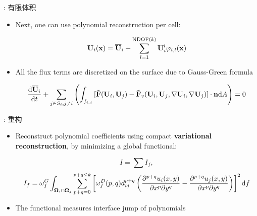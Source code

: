 \documentclass[aspectratio=169,serif]{beamer} %
\begin{document}
\begin{frame}{\secname: 有限体积}
  \begin{itemize}
    \item Next, one can use polynomial reconstruction per cell:
          \begin{block}{}
            \begin{equation}
              \label{eq:FVRec}
              \mathbf{U}_i(\mathbf{x}) = \overline{\mathbf{U}}_i + \sum_{l=1}^{\mathrm{NDOF}(k)}{\mathbf{U}_i^l\varphi_{i,l}(\mathbf{x}) }
            \end{equation}
          \end{block}
    \item All the flux terms are discretized on the surface due to Gauss-Green formula
          \begin{block}{}
            \begin{equation}
              \label{eq:FVInt}
              \frac{\dd\overline{\mathbf{U}}_i}{\dd t}
              +\sum_{j\in S_i, j\neq i}{\left(
                \int_{f_{i,j}}{
                  [\tilde{\mathbf{F}}(\mathbf{U}_i,\mathbf{U}_j) - \tilde{\mathbf{F}}_v(\mathbf{U}_i,\mathbf{U}_j, \nabla \mathbf{U}_i, \nabla \mathbf{U}_j)] \cdot \mathbf{n}  \dd A
                }\right)
              }
              = 0
            \end{equation}
          \end{block}
  \end{itemize}
\end{frame}

\begin{frame}{\secname: 重构}
  \begin{itemize}
    \item Reconstruct polynomial coefficients using compact
            {\bf variational reconstruction}\cite{wang2017compact_VR},
          by minimizing a global
          functional:
          \begin{block}{}
            \begin{equation}
              I = \sum{I_f},
            \end{equation}
            \begin{equation}
              I_f = \omega_f^G\int_{\OO_i \cap \OO_j}{
                \sum_{p+q=0}^{p + q\leq k}\left[
                  \omega_f^D(p,q)
                  d_{ij}^{p+q}
                  \left(
                  \partialderivative{^{p+q}u_i(x,y)}{x^p\partial y^q}
                  -
                  \partialderivative{^{p+q}u_j(x,y)}{x^p\partial y^q}
                  \right)
                  \right]^2
                \dd f
              }
            \end{equation}
          \end{block}
    \item The functional measures interface jump of polynomials
  \end{itemize}
\end{frame}
\end{document}
